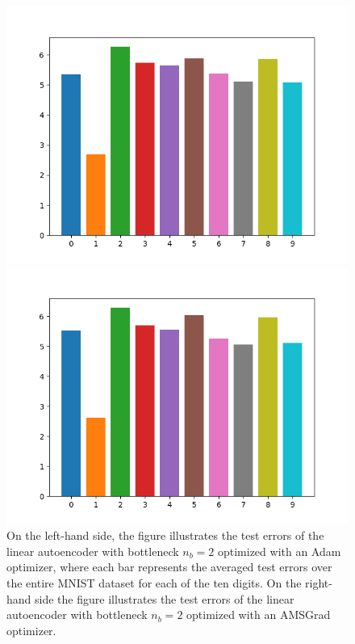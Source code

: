 \begin{figure}
\begin{center}
   \begin{minipage}[b]{0.49\linewidth}
      \includegraphics[trim = 15mm 5mm 15mm 10mm, clip, width=\linewidth]{linear_AE_2d_adam_errors}
	\end{minipage}
   \begin{minipage}[b]{0.49\linewidth}
      \includegraphics[trim = 15mm 5mm 15mm 10mm, clip, width=\linewidth]{linear_AE_2d_amsgrad_errors}
	\end{minipage}
\end{center}
\caption{On the left-hand side, the figure illustrates the test errors of the linear autoencoder with bottleneck $n_b=2$ optimized with an Adam optimizer, where each bar represents the averaged test errors over the entire MNIST dataset for each of the ten digits. On the right-hand side the figure illustrates the test errors of the linear autoencoder with bottleneck $n_b=2$ optimized with an AMSGrad optimizer.}\label{fig:linear_AE_2d_errors}
\end{figure}


